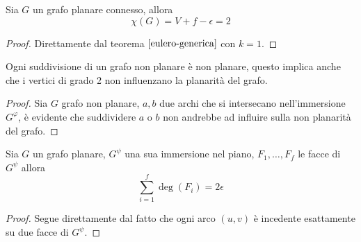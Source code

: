 \begin{corollario}\label{formulaeulero}
    Sia \(G\) un grafo planare connesso, allora
    \begin{equation}
        \chi(G)=V+f-\epsilon = 2
    \end{equation}
    \begin{proof}
        Direttamente dal teorema \(\ref{eulero-generica}\) con \(k=1\).
    \end{proof}
\end{corollario}

\begin{proposizione}
    Ogni suddivisione di un grafo non planare è non planare, questo implica anche che i vertici di grado 2 non influenzano la planarità del grafo.
    \begin{proof}
        Sia \(G\) grafo non planare, \(a,b\) due archi che si intersecano nell'immersione \(G^\varphi\), è evidente che suddividere \(a\) o \(b\) non andrebbe ad influire sulla non planarità del grafo.
    \end{proof}
\end{proposizione}

\begin{lemma}\label{gradifacce}
    Sia \(G\) un grafo planare, \(G^\psi\) una sua immersione nel piano, \(F_1, \dots, F_f\) le facce di \(G^\psi\) allora
    \begin{equation}
        \sum_{i=1}^f \deg(F_i) = 2\epsilon
    \end{equation}
    \begin{proof}
        Segue direttamente dal fatto che ogni arco \((u,v)\) è incedente esattamente su due facce di \(G^\psi\).
    \end{proof}
\end{lemma}

